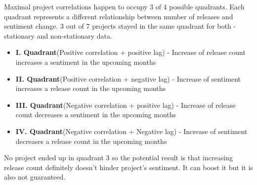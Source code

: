 Maximal project correlations happen to occupy 3 of 4 possible quadrants. Each quadrant represents a different relationship between number of releases and sentiment change. 3 out of 7 projects stayed in the same quadrant for both - stationary and non-stationary data.

\begin{itemize}
  \item \textbf{I. Quadrant}(Positive correlation + positive lag) - Increase of release count increases a sentiment in the upcoming months
  \item \textbf{II. Quadrant}(Positive correlation + negative lag) - Increase of sentiment increases a release count in the upcoming months
  \item \textbf{III. Quadrant}(Negative correlation + positive lag) - Increase of release count decreases a sentiment in the upcoming months
  \item \textbf{IV. Quadrant}(Negative correlation + Negative lag) - Increase of sentiment decreases a release count in the upcoming months
\end{itemize}

No project ended up in quadrant 3 so the potential result is that increasing release count definitely doesn't hinder project's sentiment. It can boost it but it is also not guaranteed.
